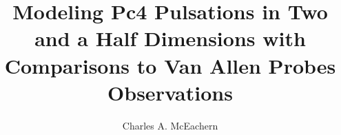 

\phd %

%
\title{\bf Modeling Pc4 Pulsations in Two and a Half Dimensions with Comparisons to Van Allen Probes Observations}
\author{Charles A. McEachern}


\abstract{}

\copyrightpageccbysa %

\acknowledgements{}


\beforepreface

\figurespage
\tablespage

\afterpreface
